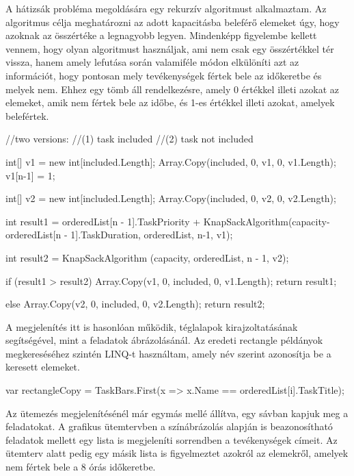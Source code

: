 
A hátizsák probléma megoldására egy rekurzív algoritmust alkalmaztam. Az algoritmus célja meghatározni az adott kapacitásba beleférő elemeket úgy, hogy  azoknak az összértéke a legnagyobb legyen. Mindenképp figyelembe kellett vennem, hogy olyan algoritmust használjak, ami nem csak egy összértékkel tér vissza, hanem amely lefutása során valamiféle módon elkülöníti azt az információt, hogy pontosan mely tevékenységek fértek bele az időkeretbe és melyek nem. Ehhez egy tömb áll rendelkezésre, amely 0 értékkel illeti azokat az elemeket, amik nem fértek bele az időbe, és 1-es értékkel illeti azokat, amelyek belefértek.

\begin{java}
//two versions:
//(1) task included
//(2) task not included

int[] v1 = new int[included.Length];
Array.Copy(included, 0, v1, 0, v1.Length);
v1[n-1] = 1;
	
int[] v2 = new int[included.Length];
Array.Copy(included, 0, v2, 0, v2.Length);
	
int result1 = orderedList[n - 1].TaskPriority
+ KnapSackAlgorithm(capacity-orderedList[n - 1].TaskDuration,
orderedList, n-1, v1);
	
int result2 = KnapSackAlgorithm
(capacity, orderedList, n - 1, v2);
	
if (result1 > result2)
{
	Array.Copy(v1, 0, included, 0, v1.Length);
	return result1;
}
	
else
{
	Array.Copy(v2, 0, included, 0, v2.Length);
	return result2;
}
\end{java}


A megjelenítés itt is hasonlóan működik, téglalapok kirajzoltatásának segítségével, mint a feladatok ábrázolásánál. Az eredeti rectangle példányok megkereséséhez szintén LINQ-t használtam, amely név szerint azonosítja be a keresett elemeket.

\begin{java}
var rectangleCopy =
TaskBars.First(x => x.Name == orderedList[i].TaskTitle);
\end{java}

Az ütemezés megjelenítésénél már egymás mellé állítva, egy sávban kapjuk meg a feladatokat. A grafikus ütemtervben a színábrázolás alapján is beazonosítható feladatok mellett egy lista is megjeleníti sorrendben a tevékenységek címeit. Az ütemterv alatt pedig egy másik lista is figyelmeztet azokról az elemekről, amelyek nem fértek bele a 8 órás időkeretbe.
